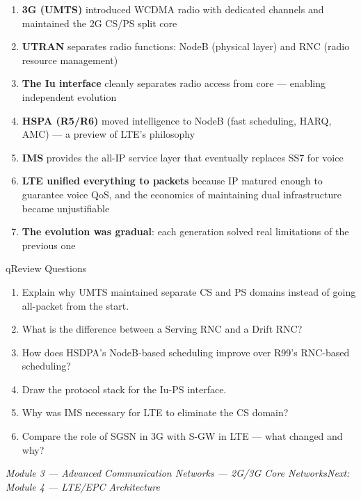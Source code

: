 \begin{enumerate}
\def\labelenumi{\arabic{enumi}.}
\tightlist
\item
  \textbf{3G (UMTS)} introduced WCDMA radio with dedicated channels and maintained the 2G CS/\allowbreak{}PS split core
\item
  \textbf{UTRAN} separates radio functions: NodeB (physical layer) and RNC (radio resource management)
\item
  \textbf{The Iu interface} cleanly separates radio access from core — enabling independent evolution
\item
  \textbf{HSPA (R5/\allowbreak{}R6)} moved intelligence to NodeB (fast scheduling, HARQ, AMC) — a preview of LTE’s philosophy
\item
  \textbf{IMS} provides the all-IP service layer that eventually replaces SS7 for voice
\item
  \textbf{LTE unified everything to packets} because IP matured enough to guarantee voice QoS, and the economics of maintaining dual infrastructure became unjustifiable
\item
  \textbf{The evolution was gradual}: each generation solved real limitations of the previous one
\end{enumerate}


\begin{CNbox}[unbreakable]{q}{Review Questions}

\begin{enumerate}
\def\labelenumi{\arabic{enumi}.}
\tightlist
\item
  Explain why UMTS maintained separate CS and PS domains instead of going all-packet from the start.
\item
  What is the difference between a Serving RNC and a Drift RNC?
\item
  How does HSDPA’s NodeB-based scheduling improve over R99’s RNC-based scheduling?
\item
  Draw the protocol stack for the Iu-PS interface.
\item
  Why was IMS necessary for LTE to eliminate the CS domain?
\item
  Compare the role of SGSN in 3G with S-GW in LTE — what changed and why?
\end{enumerate}

\emph{Module 3 — Advanced Communication Networks — 2G/\allowbreak{}3G Core Networks}\CNbr{}\emph{Next: Module 4 — LTE/\allowbreak{}EPC Architecture}

\end{CNbox}

